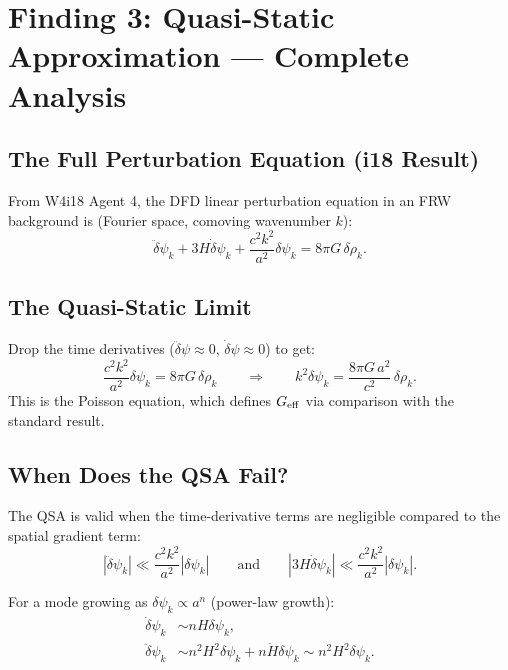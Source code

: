 \documentclass[11pt]{article}
\theoremstyle{definition}
\theoremstyle{remark}
\newcommand{\Geff}{G_{\rm eff}}
\newcommand{\dpsi}{\delta\psi}
\begin{document}
\section{Finding 3: Quasi-Static Approximation --- Complete Analysis}
\label{sec:qsa}

\subsection{The Full Perturbation Equation (i18 Result)}

From W4i18 Agent 4, the DFD linear perturbation equation in an FRW
background is (Fourier space, comoving wavenumber $k$):
\begin{equation}
\ddot\dpsi_k + 3H\dot\dpsi_k + \frac{c^2 k^2}{a^2}\dpsi_k
= 8\pi G\,\delta\rho_k.
\label{eq:full-wave}
\end{equation}

\subsection{The Quasi-Static Limit}

Drop the time derivatives ($\ddot\dpsi \approx 0$, $\dot\dpsi \approx 0$)
to get:
\begin{equation}
\frac{c^2 k^2}{a^2}\dpsi_k = 8\pi G\,\delta\rho_k
\qquad\Longrightarrow\qquad
k^2\dpsi_k = \frac{8\pi G\,a^2}{c^2}\,\delta\rho_k.
\label{eq:poisson}
\end{equation}
This is the Poisson equation, which defines $\Geff$ via comparison
with the standard result.

\subsection{When Does the QSA Fail?}

The QSA is valid when the time-derivative terms are negligible
compared to the spatial gradient term:
\begin{equation}
|\ddot\dpsi_k| \ll \frac{c^2 k^2}{a^2}|\dpsi_k|
\qquad\text{and}\qquad
|3H\dot\dpsi_k| \ll \frac{c^2 k^2}{a^2}|\dpsi_k|.
\end{equation}

For a mode growing as $\dpsi_k \propto a^n$ (power-law growth):
\begin{align}
\dot\dpsi_k &\sim n H \dpsi_k, \\
\ddot\dpsi_k &\sim n^2 H^2 \dpsi_k + n\dot{H}\dpsi_k
\sim n^2 H^2 \dpsi_k.
\end{align}
\end{document}
